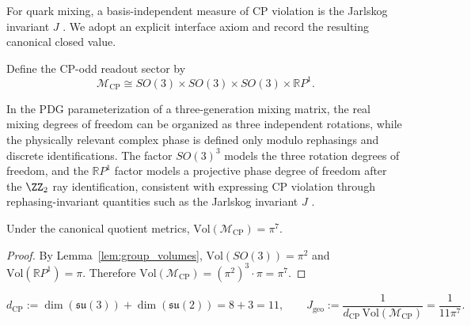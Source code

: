 For quark mixing, a basis-independent measure of CP violation is the Jarlskog invariant $J$ \cite{Jarlskog1985}.
We adopt an explicit interface axiom and record the resulting canonical closed value.
\begin{axiom}\label{ax:cp_phase_space}
Define the CP-odd readout sector by
\begin{equation}\label{eq:cp_phase_space}
\mathcal{M}_{\mathrm{CP}}\cong SO(3)\times SO(3)\times SO(3)\times \mathbb{R}P^1.
\end{equation}
\end{axiom}

\begin{remark}\label{rem:cp_phase_space_structure}
In the PDG parameterization of a three-generation mixing matrix, the real mixing degrees of freedom can be organized as three independent rotations, while the physically relevant complex phase is defined only modulo rephasings and discrete identifications.
The factor $SO(3)^3$ models the three rotation degrees of freedom, and the $\mathbb{R}P^1$ factor models a projective phase degree of freedom after the $\ZZ_2$ ray identification, consistent with expressing CP violation through rephasing-invariant quantities such as the Jarlskog invariant $J$ \cite{Jarlskog1985,PDGRPP2024,Nakahara2003}.
\end{remark}
\begin{lemma}\label{lem:cp_volume_pi7}
Under the canonical quotient metrics, $\mathrm{Vol}(\mathcal{M}_{\mathrm{CP}})=\pi^7$.
\end{lemma}
\begin{proof}
By Lemma~\ref{lem:group_volumes}, $\mathrm{Vol}(SO(3))=\pi^2$ and $\mathrm{Vol}(\mathbb{R}P^1)=\pi$.
Therefore $\mathrm{Vol}(\mathcal{M}_{\mathrm{CP}})=(\pi^2)^3\cdot \pi=\pi^7$.
\end{proof}
\begin{equation}\label{eq:j_geo}
d_{\mathrm{CP}}:=\dim(\mathfrak{su}(3))+\dim(\mathfrak{su}(2))=8+3=11,
\qquad
J_{\mathrm{geo}}:=\frac{1}{d_{\mathrm{CP}}\,\mathrm{Vol}(\mathcal{M}_{\mathrm{CP}})}=\frac{1}{11\pi^7}.
\end{equation}

